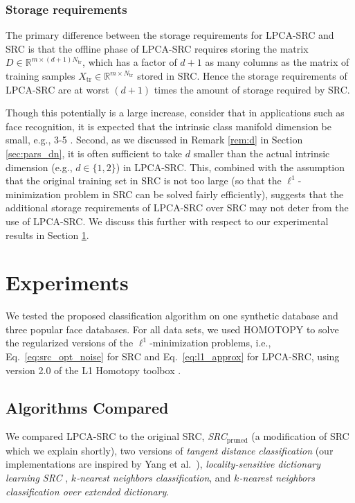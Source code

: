 \documentclass[review]{elsarticle}
\begin{document}
\subsubsection{Storage requirements} \label{sec:storage}

The primary difference between the storage requirements for LPCA-SRC and SRC is that the offline phase of LPCA-SRC requires storing the matrix $D \in \mathbb{R}^{m \times (d+1)N_\mathrm{tr}}$, which has a factor of $d+1$ as many columns as the matrix of training samples $X_\mathrm{tr} \in \mathbb{R}^{m\times N_\mathrm{tr}}$ stored in SRC. Hence the storage requirements of LPCA-SRC are at worst $(d+1)$ times the amount of storage required by SRC.

Though this potentially is a large increase, consider that in applications such as face recognition, it is expected that the intrinsic class manifold dimension be small, e.g., 3-5 \cite{lee:linss}. Second, as we discussed in Remark \ref{rem:d} in Section \ref{sec:pars_dn}, it is often sufficient to take $d$ smaller than the actual intrinsic dimension (e.g., $d \in \{1,2\}$) in LPCA-SRC. This, combined with the assumption that the original training set in SRC is not too large (so that the $\ell^1$-minimization problem in SRC can be solved fairly efficiently), suggests that the additional storage requirements of LPCA-SRC over SRC may not deter from the use of LPCA-SRC. We discuss this further with respect to our experimental results in Section \ref{sec:exp_res}. 



\section{Experiments} \label{sec:exp_res}

We tested the proposed classification algorithm on one synthetic database and three popular face databases. For all data sets, we used HOMOTOPY to solve the regularized versions of the $\ell^1$-minimization problems, i.e., Eq.~\eqref{eq:src_opt_noise} for SRC and Eq.~\eqref{eq:l1_approx} for LPCA-SRC, using version 2.0 of the L1 Homotopy toolbox \cite{asif:hom}.

\subsection{Algorithms Compared} \label{sec:algs_compared}

We compared LPCA-SRC to the original SRC, \emph{SRC}$\mathit{_{\mathrm{pruned}}}$ (a modification of SRC which we explain shortly), two versions of \emph{tangent distance classification} (our implementations are inspired by Yang et al.\ \cite{yan:ltd}), \emph{locality-sensitive dictionary learning SRC} \cite{wei:lsdl}, $\mathit{k}$\emph{-nearest neighbors classification}, and $\mathit{k}$\emph{-nearest neighbors classification over extended dictionary}. 
\end{document}
